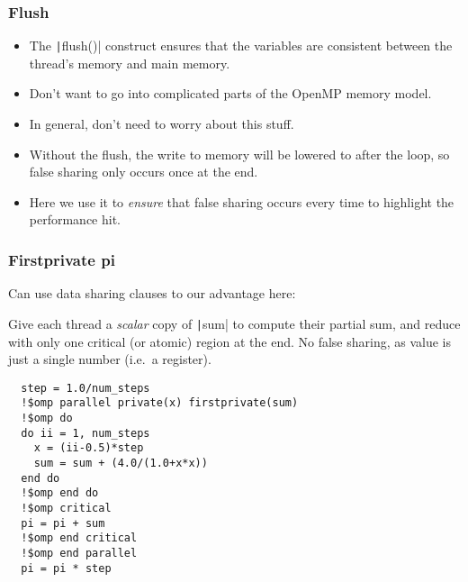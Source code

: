 \documentclass{beamer}
\begin{document}
\begin{frame}
\frametitle{Flush}
\begin{itemize}
  \item The \texttt|flush()| construct ensures that the variables are consistent between the thread's memory and main memory.
  \item Don't want to go into complicated parts of the OpenMP memory model.
  \item In general, don't need to worry about this stuff.
  \item Without the flush, the write to memory will be lowered to after the loop, so false sharing only occurs once at the end.
  \item Here we use it to \emph{ensure} that false sharing occurs every time to highlight the performance hit.
\end{itemize}
\end{frame}

\begin{frame}[fragile]
\frametitle{Firstprivate pi}
Can use data sharing clauses to our advantage here:

Give each thread a \emph{scalar} copy of \texttt|sum| to compute their partial sum, and reduce with only one critical (or atomic) region at the end.
No false sharing, as value is just a single number (i.e.\ a register).
\begin{verbatim}
  step = 1.0/num_steps
  !$omp parallel private(x) firstprivate(sum)
  !$omp do
  do ii = 1, num_steps
    x = (ii-0.5)*step
    sum = sum + (4.0/(1.0+x*x))
  end do
  !$omp end do
  !$omp critical
  pi = pi + sum
  !$omp end critical
  !$omp end parallel
  pi = pi * step
\end{verbatim}
\end{frame}
\end{document}
